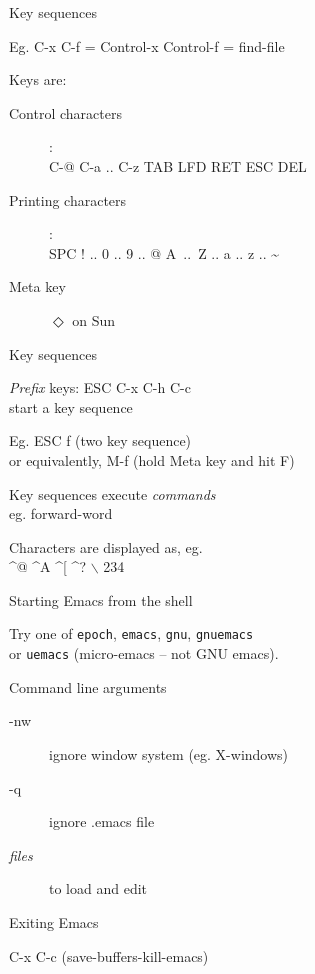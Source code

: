 \begin{slide}{}
Key sequences

Eg. C-x C-f  =  Control-x Control-f  =  find-file

Keys are:
\begin{description}
\item[Control characters] : \\
C-@ C-a .. C-z TAB LFD RET ESC DEL
\item[Printing characters] : \\
SPC ! .. 0 .. 9 .. @ A~..~Z .. a .. z .. \~{}
\item[Meta key] $\Diamond$ on Sun
\end{description}
\end{slide}

\begin{slide}{}
Key sequences

\vspace{3cm}

{\em Prefix} keys: ESC C-x C-h C-c \\
start a key sequence

Eg. ESC f (two key sequence) \\
or equivalently, M-f (hold Meta key and hit F)

Key sequences execute {\em commands} \\
eg. forward-word

Characters are displayed as, eg. \\
\^{}@ \^{}A \^{}[ \^{}? $\backslash$ 234
\end{slide}

\begin{slide}{}
Starting Emacs from the shell

Try one of {\tt epoch}, {\tt emacs}, {\tt gnu}, {\tt gnuemacs} \\
or {\tt uemacs} (micro-emacs -- not GNU emacs).

Command line arguments
\begin{description}
\item[-nw]
ignore window system (eg. X-windows)
\item[-q]
ignore .emacs file
\item[\em files]
to load and edit
\end{description}
Exiting Emacs

C-x C-c (save-buffers-kill-emacs)
\end{slide}

